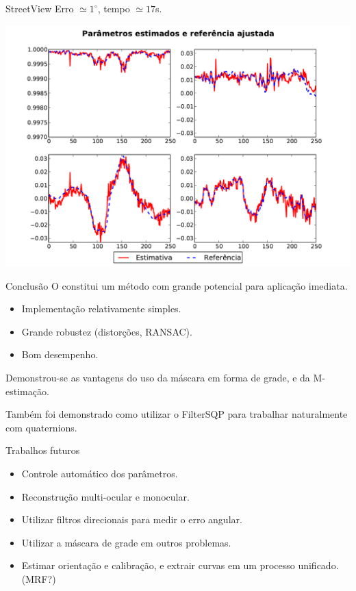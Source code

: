 \begin{frame}{StreetView}
  Erro $\simeq 1^\circ$, tempo $\simeq 17$s.

\begin{center}
    \includegraphics[height=12\baselineskip]{street_fit.pdf}
  \end{center}
\end{frame}
  

\begin{frame}{Conclusão}
  O \corisco constitui um método com grande potencial para aplicação imediata.\\
  \begin{itemize}
  \item Implementação relativamente simples.
  \item Grande robustez (distorções, RANSAC).
  \item Bom desempenho.
  \end{itemize}
  
  Demonstrou-se as vantagens do uso da máscara em forma de grade, e da
  M-estimação.

  Também foi demonstrado como  utilizar o FilterSQP para trabalhar naturalmente
  com quaternions.
\end{frame}  

\begin{frame}{Trabalhos futuros}
  \begin{itemize}
  \item Controle automático dos parâmetros.
  \item Reconstrução multi-ocular e monocular.
  \item Utilizar filtros direcionais para medir o erro angular.
  \item Utilizar a máscara de grade em outros problemas.
  \item Estimar orientação e calibração, e extrair curvas em um processo
    unificado. (MRF?)
  \end{itemize}
\end{frame}



